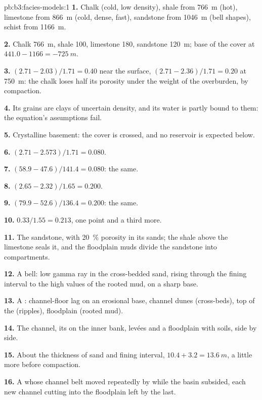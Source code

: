 \begin{solution}{pb:b3:facies-models:1}
\textbf{1.} Chalk (cold, low density), shale from \qty{766}{m} (hot), limestone from
\qty{866}{m} (cold, dense, fast), sandstone from \qty{1046}{m} (bell
shapes), schist from \qty{1166}{m}.

\textbf{2.} Chalk \qty{766}{m}, shale 100, limestone 180, sandstone
\qty{120}{m}; base of the cover at $441.0 - 1166 = \qty{-725}{m}$.

\textbf{3.} $(2.71 - 2.03)/1.71 = 0.40$ near the surface, $(2.71 -
2.36)/1.71 = 0.20$ at \qty{750}{m}: the chalk loses half its porosity
under the weight of the overburden, by compaction.

\textbf{4.} Its grains are clays of uncertain density, and its water is
partly bound to them: the equation's assumptions fail.

\textbf{5.} Crystalline basement: the cover is crossed, and no reservoir is
expected below.

\textbf{6.} $(2.71 - 2.573)/1.71 = 0.080$.

\textbf{7.} $(58.9 - 47.6)/141.4 = 0.080$: the same.

\textbf{8.} $(2.65 - 2.32)/1.65 = 0.200$.

\textbf{9.} $(79.9 - 52.6)/136.4 = 0.200$: the same.

\textbf{10.} $0.33/1.55 = 0.213$, one point and a third more.

\textbf{11.} The sandstone, with \qty{20}{\percent} porosity in its sands;
the shale above the limestone seals it, and the floodplain muds divide the
sandstone into compartments.

\textbf{12.} A bell: low gamma ray in the cross-bedded sand, rising through
the fining interval to the high values of the rooted mud, on a sharp base.

\textbf{13.} A : channel-floor lag on an erosional
base, channel dunes (cross-beds), top of the  (ripples), floodplain
(rooted mud).

\textbf{14.} The channel, its  on the inner bank, levées and a
floodplain with soils, side by side.

\textbf{15.} About the thickness of sand and fining interval, $10.4 + 3.2 =
\qty{13.6}{m}$, a little more before compaction.

\textbf{16.} A  whose channel belt moved repeatedly by
 while the basin subsided, each new channel cutting into the
floodplain left by the last.


\end{solution}
